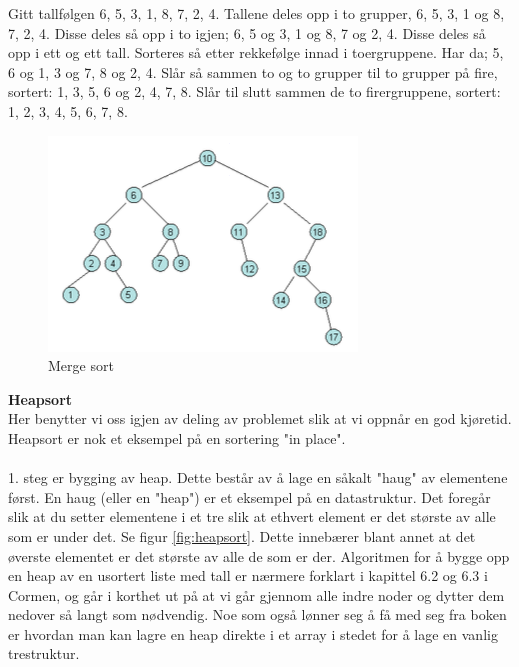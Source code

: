 \begin{boxed}
Gitt tallfølgen 6, 5, 3, 1, 8, 7, 2, 4. Tallene deles opp i to grupper, 6, 5, 3, 1 og 8, 7, 2, 4. Disse deles så opp i to igjen; 6, 5 og 3, 1 og 8, 7 og 2, 4. Disse deles så opp i ett og ett tall. Sorteres så etter rekkefølge innad i toergruppene. Har da; 5, 6 og 1, 3 og 7, 8 og 2, 4. Slår så sammen to og to grupper til to grupper på fire, sortert: 1, 3, 5, 6 og 2, 4, 7, 8. Slår til slutt sammen de to firergruppene, sortert: 1, 2, 3, 4, 5, 6, 7, 8.

\begin{figure}[H]
\includegraphics[scale=0.7]{images/mergesort}
\centering %
\caption{Merge sort}
\label{fig:mergesort}
\end{figure}
\end{boxed}

\noindent \textbf{Heapsort}\\
Her benytter vi oss igjen av deling av problemet slik at vi oppnår en god kjøretid. Heapsort er nok et eksempel på en sortering "in place".
\\\\
1. steg er bygging av heap. Dette består av å lage en såkalt "haug" av elementene først. En haug (eller en "heap") er et eksempel på en datastruktur. Det foregår slik at du setter elementene i et tre slik at ethvert element er det største av alle som er under det. Se figur \ref{fig:heapsort}. Dette innebærer blant annet at det øverste elementet er det største av alle de som er der. Algoritmen for å bygge opp en heap av en usortert liste med tall er nærmere forklart i kapittel 6.2 og 6.3 i Cormen, og går i korthet ut på at vi går gjennom alle indre noder og dytter dem nedover så langt som nødvendig. Noe som også lønner seg å få med seg fra boken er hvordan man kan lagre en heap direkte i et array i stedet for å lage en vanlig trestruktur.

